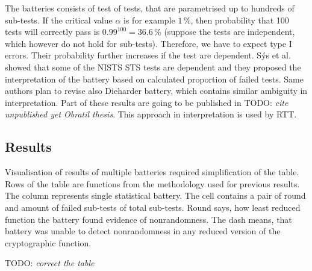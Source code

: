 \documentclass[
  print, %
  Table,   %
  nolof,     %
  nolot,     %
  11pt, %
  oneside  %
]{fithesis3}
\newcommand{\todo}[1]{TODO: \textit{#1}}
\begin{document}
The batteries consists of test of tests, that are parametrised up to hundreds of sub-tests. If the critical value $\alpha$ is for example $1\,\%$, then probability that 100 tests will correctly pass is $0.99^{100}=36.6\,\%$ (suppose the tests are independent, which however do not hold for sub-tests). Therefore, we have to expect type I errors. Their probability further increases if the test are dependent. Sýs et al.~\cite{sys2015interpretation} showed that some of the NISTS STS tests are dependent and they proposed the interpretation of the battery based on calculated proportion of failed tests. Same authors plan to revise also Dieharder battery, which contains similar ambiguity in interpretation. Part of these results are going to be published in \todo{cite unpublished yet Obratil thesis}. This approach in interpretation is used by RTT.

\subsection{Results}
\label{subsec:relatwork-stat-res}

Visualisation of results of multiple batteries required simplification of the table. Rows of the table are functions from the methodology used for previous results. The column represents single statistical battery. The cell contains a pair of round and amount of failed sub-tests of total sub-tests. Round says, how least reduced function the battery found evidence of nonrandomness. The dash means, that battery was unable to detect nonrandomness in any reduced version of the cryptographic function.

\todo{correct the table}
\end{document}
